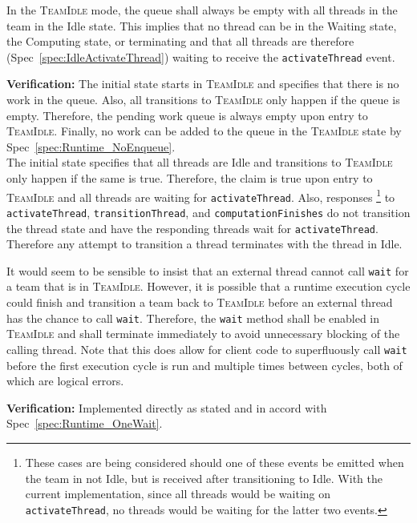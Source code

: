 \documentclass{article}
\newcommand{\TeamIdle}          {\textsc{TeamIdle}}
\begin{document}
\begin{spec}
In the {\TeamIdle} mode, the queue shall always be empty with all threads in the
team in the Idle state.  This implies that no thread can be in the Waiting
state, the Computing state, or terminating and that all threads are therefore
(Spec~\ref{spec:IdleActivateThread}) waiting to receive the
\texttt{activateThread} event.
\end{spec}
\textbf{Verification:}\hspace{0.125in}  The initial state starts in {\TeamIdle}
and specifies that there is no work in the queue.  Also, all transitions to
{\TeamIdle} only happen if the queue is empty.  Therefore, the pending work
queue is always empty upon entry to \TeamIdle.  Finally, no work can be added to
the queue in the {\TeamIdle} state by Spec~\ref{spec:Runtime_NoEnqueue}.\\

The initial state specifies that all threads are Idle and transitions to
{\TeamIdle} only happen if the same is true.  Therefore, the claim is true upon
entry to {\TeamIdle} and all threads are waiting for \texttt{activateThread}.
Also, responses
\footnote{These cases are being considered should one of these
events be emitted when the team in not Idle, but is received after transitioning
to Idle.  With the current implementation, since all threads would be waiting on
\texttt{activateThread}, no threads would be waiting for the latter two events.}
to \texttt{activateThread}, \texttt{transitionThread}, and
\texttt{computationFinishes} do not transition the thread state and have the
responding threads wait for \texttt{activateThread}.  Therefore any attempt to
transition a thread terminates with the thread in Idle.

\begin{spec}
It would seem to be sensible to insist that an external thread cannot call
\texttt{wait} for a team that is in \TeamIdle.  However, it is possible that a
runtime execution cycle could finish and transition a team back to {\TeamIdle}
before an external thread has the chance to call \texttt{wait}.  Therefore, the
\texttt{wait} method shall be enabled in {\TeamIdle} and shall terminate immediately to avoid
unnecessary blocking of the calling thread.  Note that this does allow for
client code to superfluously call \texttt{wait} before the first execution cycle
is run and multiple times between cycles, both of which are logical errors.
\end{spec}
\textbf{Verification:}\hspace{0.125in}  Implemented directly as stated and in
accord with Spec~\ref{spec:Runtime_OneWait}.  
\end{document}
